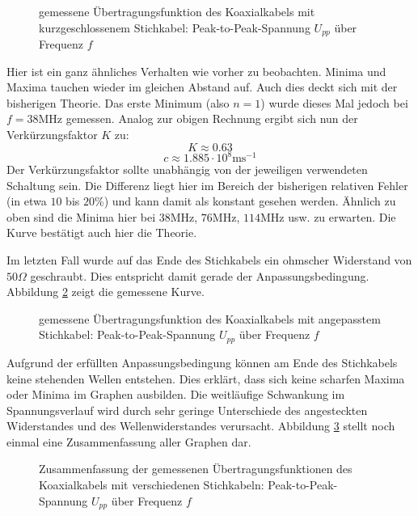 		\begin{figure}[H]
			\center
			
			\caption{\centering gemessene Übertragungsfunktion des Koaxialkabels mit kurzgeschlossenem Stichkabel: Peak-to-Peak-Spannung $U_{pp}$ über Frequenz $f$} %
			\label{diagramm_stichkabel_geschlossen}
		\end{figure}

		Hier ist ein ganz ähnliches Verhalten wie vorher zu beobachten.
		Minima und Maxima tauchen wieder im gleichen Abstand auf.
		Auch dies deckt sich mit der bisherigen Theorie.
		Das erste Minimum (also $n = 1$) wurde dieses Mal jedoch bei $f = 38$MHz gemessen.
		Analog zur obigen Rechnung ergibt sich nun der Verkürzungsfaktor $K$ zu:
		\[
			K \approx 0.63
		\]
		\[
			c \approx 1.885\cdot 10^8\text{ms}^{-1}
		\]
		Der Verkürzungsfaktor sollte unabhängig von der jeweiligen verwendeten Schaltung sein.
		Die Differenz liegt hier im Bereich der bisherigen relativen Fehler (in etwa $10$ bis $20$\%) und kann damit als konstant gesehen werden.
		Ähnlich zu oben sind die Minima hier bei $38$MHz, $76$MHz, $114$MHz usw. zu erwarten.
		Die Kurve bestätigt auch hier die Theorie.

		Im letzten Fall wurde auf das Ende des Stichkabels ein ohmscher Widerstand von $50\Omega$ geschraubt.
		Dies entspricht damit gerade der Anpassungsbedingung.
		Abbildung \ref{diagramm_stichkabel_angepasst} zeigt die gemessene Kurve.

		\begin{figure}[H]
			\center
			
			\caption{\centering gemessene Übertragungsfunktion des Koaxialkabels mit angepasstem Stichkabel: Peak-to-Peak-Spannung $U_{pp}$ über Frequenz $f$} %
			\label{diagramm_stichkabel_angepasst}
		\end{figure}

		Aufgrund der erfüllten Anpassungsbedingung können am Ende des Stichkabels keine stehenden Wellen entstehen.
		Dies erklärt, dass sich keine scharfen Maxima oder Minima im Graphen ausbilden.
		Die weitläufige Schwankung im Spannungsverlauf wird durch sehr geringe Unterschiede des angesteckten Widerstandes und des Wellenwiderstandes verursacht.
		Abbildung \ref{diagramm_stichkabel_alles} stellt noch einmal eine Zusammenfassung aller Graphen dar.

		\begin{figure}[H]
			\center
			
			\caption{\centering Zusammenfassung der gemessenen Übertragungsfunktionen des Koaxialkabels mit verschiedenen Stichkabeln: Peak-to-Peak-Spannung $U_{pp}$ über Frequenz $f$} %
			\label{diagramm_stichkabel_alles}
		\end{figure}


